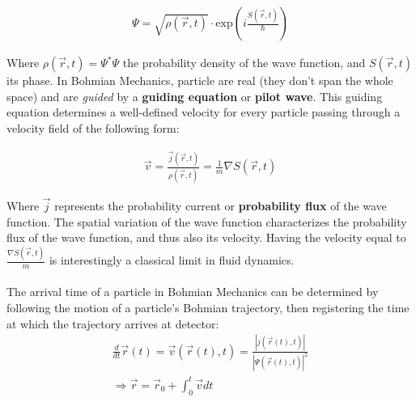 \begin{align}
    \Psi = \sqrt{\rho(\vec{r},t)} \cdot \text{exp}\left( i \frac{S(\vec{r},t)}{\hbar} \right)
\end{align}

Where $\rho(\vec{r},t) = \Psi^*\Psi$ the probability density of the wave function, and $S(\vec{r},t)$ its phase. In Bohmian Mechanics, particle are real (they don't span the whole space) and are \textit{guided} by a \textbf{guiding equation} or \textbf{pilot wave}. This guiding equation determines a well-defined velocity for every particle passing through a velocity field of the following form:

\begin{align}
\label{eq:velocityfield}
\vec{v} = \frac{\vec{j}(\vec{r}, t)}{\rho(\vec{r}, t)} = \frac{1}{m} \nabla S(\vec{r},t)
\end{align}

Where $\vec{j}$ represents the probability current or \textbf{probability flux} of the wave function. The spatial variation of the wave function characterizes the probability flux of the wave function, and thus also its velocity. Having the velocity equal to $\frac{\nabla S(\vec{r},t)}{m}$ is interestingly a classical limit in fluid dynamics.
\\\\
The arrival time of a particle in Bohmian Mechanics can be determined by following the motion of a particle's Bohmian trajectory, then registering the time at which the trajectory arrives at detector:
\begin{align}
\frac{d}{dt} \vec{r}(t) = \vec{v} (\vec{r}(t), t) = \frac{|j(\vec{r}(t), t)|}{|\Psi(\vec{r}(t), t)|^2} \\
\Rightarrow \vec{r} = \vec{r}_0 + \int_0^t \vec{v} dt
\end{align}

